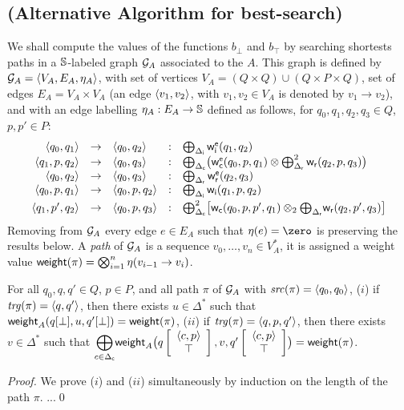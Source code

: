 %

\subsection*{(Alternative Algorithm for best-search)}
We shall compute the values of the functions $b_\bot$ and $b_\top$
by searching shortests paths in a $\mathbb{S}$-labeled graph $\mathcal{G}_A$
associated to the \SWVPA $A$. 
This graph is defined by $\G_A = \< V_A, E_A, \eta_A >$, 
with set of vertices $V_A = (Q \times Q) \cup (Q \times P \times Q)$,
set of edges $E_A = V_A \times V_A$
(an edge $\< v_1, v_2>$, with $v_1, v_2 \in V_A$ is denoted by $v_1 \to v_2$),
and with an edge labelling  
$\eta_A : E_A \to \mathbb{S}$ defined as follows,
for $q_0, q_1, q_2, q_3 \in Q$, $p, p' \in P$:
%
\[
\begin{array}{rclcl}
\< q_0, q_1> & \to & \< q_0, q_2> & : &
\bigoplus_{\Deltai} \weiei(q_1, q_2)\\
%
\< q_1, p, q_2> & \to & \<q_0, q_3> & : &
\bigoplus_{\Deltac} \bigl( \weiec(q_0, p, q_1) \otimes \bigoplus^2_{\Deltar} \weir(q_2, p, q_3)\bigr)\\ 
%
\< q_0, q_2> & \to & \< q_0, q_3> & : & 
\bigoplus_{\Deltar} \weier(q_2, q_3)\\
% 
\< q_0, p, q_1> & \to & \< q_0, p, q_2> & : &
\bigoplus_{\Deltai} \weii(q_1, p, q_2)\\[1mm]
%
\< q_1, p', q_2> & \to & \< q_0, p, q_3> & : &
\bigoplus^2_{\Deltac} \bigl[ \weic(q_0, p, p', q_1) \otimes_2 {\bigoplus_{\Deltar}} \weir(q_2, p', q_3) \bigr]\\
\end{array}
\]
Removing from $\mathcal{G}_A$ every edge $e \in E_A$ such that $\eta(e) = \zero$ 
is preserving the results below.
%
A \emph{path} of $\mathcal{G}_A$ is a sequence $v_0,\ldots, v_n \in V^*_A$,
it is assigned a weight value $\mathsf{weight}(\pi) = \bigotimes_{i=1}^{n} \eta(v_{i-1} \to v_i)$.

\begin{lemma}[Correctness]
For all $q_0, q, q' \in Q$, $p\in P$, 
and all path $\pi$ of $\mathcal{G}_A$ with $\src(\pi) = \<q_0, q_0>$,
($i$) if $\trg(\pi) = \< q, q'>$, 
then there exists $u \in \Delta^*$ such that 
$\mathsf{weight}_A(q[\bot], u, q'[\bot]) = \mathsf{weight}(\pi)$,
%
($ii$) if $\trg(\pi) = \< q, p, q'>$,
then there exists $v \in \Delta^*$ such that 
${\displaystyle\bigoplus_{c \in \Deltac}}
 \weight_A\bigl(\configup{q}{\< c, p> \stackup \top }, v, \configup{q'}{\<c, p> \stackup \top}\bigr)
 = \weight(\pi)$.
\end{lemma}
%
\begin{proof}
We prove ($i$) and ($ii$) simultaneously by induction on the length of the path $\pi$.
...\qed
\end{proof}



